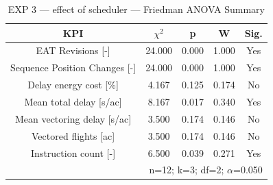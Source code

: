 \begin{table}[!t]
\caption{EXP 3 — effect of scheduler — Friedman ANOVA Summary}
\begin{center}
\footnotesize
\setlength{\tabcolsep}{3pt}
\renewcommand{\arraystretch}{1.000}
\begin{tabular}{|c|c|c|c|c|}
\hline
\textbf{KPI} & \textbf{$\chi^2$} & \textbf{p} & \textbf{W} & \textbf{Sig.} \\
\hline
EAT Revisions [-] & 24.000 & 0.000 & 1.000 & Yes \\
\hline
Sequence Position Changes [-] & 24.000 & 0.000 & 1.000 & Yes \\
\hline
Delay energy cost [\%] & 4.167 & 0.125 & 0.174 & No \\
\hline
Mean total delay [s/ac] & 8.167 & 0.017 & 0.340 & Yes \\
\hline
Mean vectoring delay [s/ac] & 3.500 & 0.174 & 0.146 & No \\
\hline
Vectored flights [ac] & 3.500 & 0.174 & 0.146 & No \\
\hline
Instruction count [-] & 6.500 & 0.039 & 0.271 & Yes \\
\hline
\multicolumn{5}{r}{n=12; k=3; df=2; $\alpha$=0.050}\\
\end{tabular}
\label{tab:exp\_3\_effect\_of\_scheduler\_friedman}
\end{center}
\end{table}
